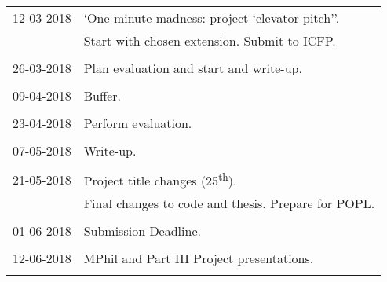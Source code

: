 \documentclass[11pt]{article}
\begin{document}
\begin{table}[H]
\begin{tabular}{ll}
    12-03-2018 & `One-minute madness: project `elevator pitch''.               \\
               &  Start with chosen extension. Submit to ICFP.                 \\
                                                                               \\

    26-03-2018 & Plan evaluation and start and write-up.                       \\
                                                                               \\

    09-04-2018 & Buffer.                                                       \\
                                                                               \\

    23-04-2018 & Perform evaluation.                                           \\
                                                                               \\

    07-05-2018 & Write-up.                                                     \\
                                                                               \\

    21-05-2018 & Project title changes (25\textsuperscript{th}).               \\
               & Final changes to code and thesis. Prepare for POPL.           \\
                                                                               \\

    01-06-2018 & Submission Deadline.                                          \\
                                                                               \\

    12-06-2018 & MPhil and Part III Project presentations.                     \\
                                                                               \\

  \bottomrule

\end{tabular}
\end{table}
\vspace*{\fill}
\newpage

 
\end{document}

